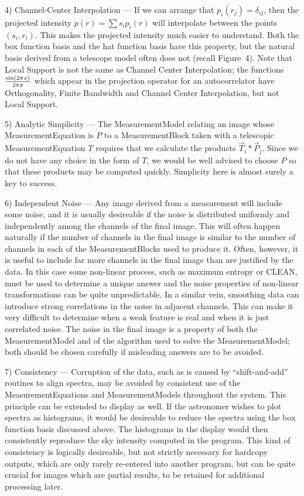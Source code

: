\item 4) Channel-Center Interpolation --- If we can arrange that $p_i(r_j)
= \delta_{ij}$, then the projected intensity $p(r) = \sum s_i p_i(r)$ 
will interpolate between the points $(s_i,r_i)$. This makes the projected
intensity much
easier to understand.  Both the box function basis and the hat function
basis have this property, but the natural basis derived from a telescope model
often does not (recall Figure~4). Note that Local Support is not the same as
Channel Center Interpolation; the functions $\sin(2 \pi x) \over {2 \pi x}$ 
which appear in the projection operator for an autocorrelator have 
Orthogonality, Finite Bandwidth and Channel Center Interpolation, but not 
Local Support.

\item 5) Analytic Simplicity --- The MeasurementModel relating an image 
whose MeasurementEquation is $P$ to a MeasurementBlock taken with a 
telescopic MeasurementEquation $T$ requires that we 
calculate the products $\vec T_i \ast \vec P_j$. Since we do not 
have any choice in the form of $T$, we would be well advised to choose $P$
so that these products may be computed quickly. Simplicity here is almost 
surely a key to success.

\item 6) Independent Noise --- Any image derived from a measurement will 
include some noise, and it is usually desireable if the noise is distributed
uniformly and independently among the channels of the final image.  This
will often happen naturally if the number of channels in the final image is 
similar to the number of channels in each of the MeasurementBlocks used to 
produce it.  Often, however,
it is useful to include far more channels in the final image than are 
justified by the data.  In this case some non-linear process, such as maximum
entropy or CLEAN,  must be used to determine a unique answer and the 
noise properties of non-linear transformations can be quite unpredictable. 
In a similar vein, smoothing data can introduce strong correlations in
the noise in adjacent channels.  This can make it very difficult to 
determine when a weak feature is real and when it is just correlated noise.
The noise in the final image is a property of both the MeasurementModel
and of the algorithm used to solve the MeasurementModel; both should be chosen
carefully if misleading answers are to be avoided.


\item 7) Consistency --- Corruption of the data, such as is caused by 
``shift-and-add'' routines to align spectra, may be avoided by consistent 
use of the MeasurementEquations and MeasurementModels throughout the system.
This principle can be extended to display as well. If the astronomer wishes
to plot spectra as histograms, it would be desireable to reduce the spectra
using the box function basis discussed above. The histograms in the display
would then consistently reproduce the sky intensity computed in the
program. This kind of consistency is logically desireable, but not strictly
necessary for hardcopy outputs, which are only rarely re-entered into
another program, but can be quite crucial for images which are partial results,
to be retained for additional processing later.

